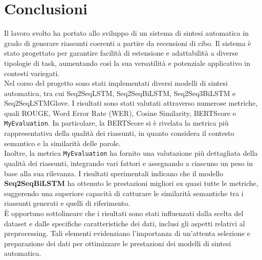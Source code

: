 \section{Conclusioni} Il lavoro svolto ha portato allo sviluppo di un sistema di sintesi automatica in grado di generare riassunti coerenti a partire da recensioni di cibo. Il sistema è stato progettato per garantire facilità di estensione e adattabilità a diverse tipologie di task, aumentando così la sua versatilità e potenziale applicativo in contesti variegati.\\
Nel corso del progetto sono stati implementati diversi modelli di sintesi automatica, tra cui Seq2SeqLSTM, Seq2SeqBiLSTM, Seq2Seq3BiLSTM e Seq2SeqLSTMGlove. 
I risultati sono stati valutati attraverso numerose metriche, quali ROUGE, Word Error Rate (WER), Cosine Similarity, BERTScore e \texttt{MyEvaluation}. In particolare, 
la BERTScore si è rivelata la metrica più rappresentativa della qualità dei riassunti, in quanto considera il contesto semantico e la similarità delle parole.\\

Inoltre, la metrica \texttt{MyEvaluation} ha fornito una valutazione più dettagliata della qualità dei riassunti, integrando vari fattori e assegnando a ciascuno 
un peso in base alla sua rilevanza. I risultati sperimentali indicano che il modello \textbf{Seq2SeqBiLSTM} ha ottenuto le prestazioni migliori su quasi tutte le metriche, 
suggerendo una superiore capacità di catturare le similarità semantiche tra i riassunti generati e quelli di riferimento.\\

È opportuno sottolineare che i risultati sono stati influenzati dalla scelta del dataset e dalle specifiche caratteristiche dei dati, 
inclusi gli aspetti relativi al preprocessing. Tali elementi evidenziano l'importanza di un'attenta selezione e preparazione dei dati per 
ottimizzare le prestazioni dei modelli di sintesi automatica.